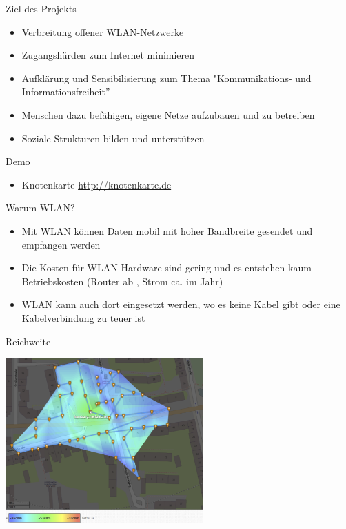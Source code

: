 \documentclass[c]{beamer}
\begin{document}
\begin{frame}{Ziel des Projekts}
	\begin{itemize}
		\item Verbreitung offener WLAN-Netzwerke
		\item Zugangshürden zum Internet minimieren
		\item Aufklärung und Sensibilisierung zum Thema "Kommunikations- und Informationsfreiheit''
		\item Menschen dazu befähigen, eigene Netze aufzubauen und zu betreiben
		\item Soziale Strukturen bilden und unterstützen
	\end{itemize}
\end{frame}


\begin{frame}{Demo}
	\begin{itemize}
		\item Knotenkarte \href{http://knotenkarte.de}{http://knotenkarte.de}
	\end{itemize}
\end{frame}



\begin{frame}{Warum WLAN?}
	\begin{itemize}
		\item Mit WLAN können Daten mobil mit hoher Bandbreite gesendet und empfangen werden
		\item Die Kosten für WLAN-Hardware sind gering und es entstehen kaum Betriebskosten (Router ab , Strom ca.  im Jahr)
		\item WLAN kann auch dort eingesetzt werden, wo es keine Kabel gibt oder eine Kabelverbindung zu teuer ist
	\end{itemize}
\end{frame}


\begin{frame}{Reichweite}
	\begin{center}
		\includegraphics[height=180pt]{Reichweite_altona001}
	\end{center}
\end{frame}
\end{document}
